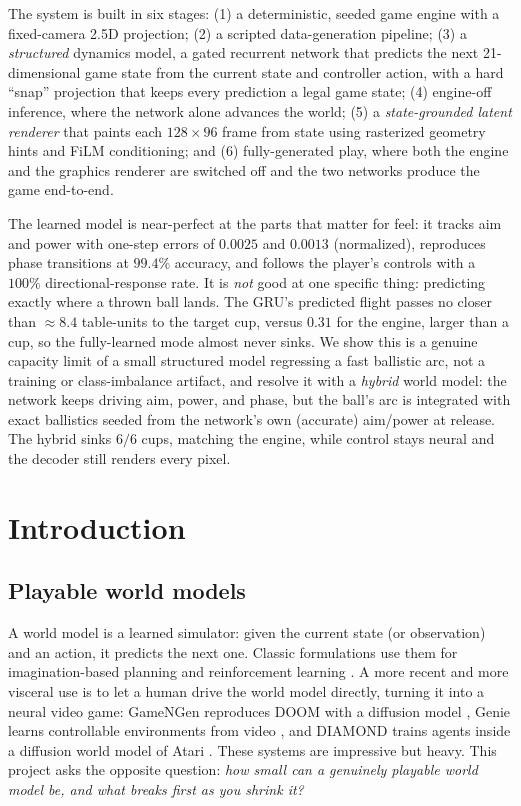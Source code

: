 \documentclass[11pt]{article}
\begin{document}
The system is built in six stages: (1) a deterministic, seeded game engine with a fixed-camera 2.5D projection; (2) a scripted data-generation pipeline; (3) a \emph{structured} dynamics model, a gated recurrent network that predicts the next 21-dimensional game state from the current state and controller action, with a hard ``snap'' projection that keeps every prediction a legal game state; (4) engine-off inference, where the network alone advances the world; (5) a \emph{state-grounded latent renderer} that paints each $128\times96$ frame from state using rasterized geometry hints and FiLM conditioning; and (6) fully-generated play, where both the engine and the graphics renderer are switched off and the two networks produce the game end-to-end.

The learned model is near-perfect at the parts that matter for feel: it tracks aim and power with one-step errors of $0.0025$ and $0.0013$ (normalized), reproduces phase transitions at $99.4\%$ accuracy, and follows the player's controls with a $100\%$ directional-response rate. It is \emph{not} good at one specific thing: predicting exactly where a thrown ball lands. The GRU's predicted flight passes no closer than $\approx 8.4$ table-units to the target cup, versus $0.31$ for the engine, larger than a cup, so the fully-learned mode almost never sinks. We show this is a genuine capacity limit of a small structured model regressing a fast ballistic arc, not a training or class-imbalance artifact, and resolve it with a \emph{hybrid} world model: the network keeps driving aim, power, and phase, but the ball's arc is integrated with exact ballistics seeded from the network's own (accurate) aim/power at release. The hybrid sinks $6/6$ cups, matching the engine, while control stays neural and the decoder still renders every pixel.

\section{Introduction}

\subsection{Playable world models}

A world model is a learned simulator: given the current state (or observation) and an action, it predicts the next one. Classic formulations use them for imagination-based planning and reinforcement learning \cite{worldmodels,dreamerv3}. A more recent and more visceral use is to let a human drive the world model directly, turning it into a neural video game: GameNGen reproduces DOOM with a diffusion model \cite{gamengen}, Genie learns controllable environments from video \cite{genie}, and DIAMOND trains agents inside a diffusion world model of Atari \cite{diamond}. These systems are impressive but heavy. This project asks the opposite question: \emph{how small can a genuinely playable world model be, and what breaks first as you shrink it?}
\end{document}
